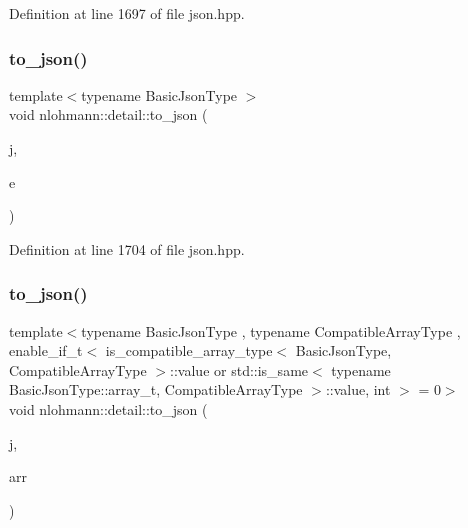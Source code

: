 Definition at line 1697 of file json.\+hpp.

\mbox{\label{namespacenlohmann_1_1detail_aeca6fb5fede5ed1e12a4420d98a5692b}} 
\subsubsection{\texorpdfstring{to\+\_\+json()}{to\_json()}\hspace{0.1cm}{\footnotesize\ttfamily [8/16]}}
{\footnotesize\ttfamily template$<$typename Basic\+Json\+Type $>$ \\
void nlohmann\+::detail\+::to\+\_\+json (\begin{DoxyParamCaption}\item[{Basic\+Json\+Type \&}]{j,  }\item[{const std\+::vector$<$ bool $>$ \&}]{e }\end{DoxyParamCaption})}



Definition at line 1704 of file json.\+hpp.

\mbox{\label{namespacenlohmann_1_1detail_a3afebc132c5ff83f9cd160e52030fdfd}} 
\subsubsection{\texorpdfstring{to\+\_\+json()}{to\_json()}\hspace{0.1cm}{\footnotesize\ttfamily [9/16]}}
{\footnotesize\ttfamily template$<$typename Basic\+Json\+Type , typename Compatible\+Array\+Type , enable\+\_\+if\+\_\+t$<$ is\+\_\+compatible\+\_\+array\+\_\+type$<$ Basic\+Json\+Type, Compatible\+Array\+Type $>$\+::value or std\+::is\+\_\+same$<$ typename Basic\+Json\+Type\+::array\+\_\+t, Compatible\+Array\+Type $>$\+::value, int $>$  = 0$>$ \\
void nlohmann\+::detail\+::to\+\_\+json (\begin{DoxyParamCaption}\item[{Basic\+Json\+Type \&}]{j,  }\item[{const Compatible\+Array\+Type \&}]{arr }\end{DoxyParamCaption})}



